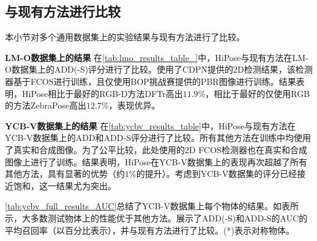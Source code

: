 \subsection{与现有方法进行比较}
本小节对多个通用数据集上的实验结果与现有方法进行了比较。



\textbf{LM-O数据集上的结果 } 在\autoref{tab:lmo_results_table_}中，HiPose与现有方法在LM-O数据集上的ADD(-S)评分进行了比较。使用了CDPN\cite{li2019cdpn}提供的2D检测结果，该检测器基于FCOS\cite{fcos}进行训练，且仅使用BOP挑战赛提供的PBR图像进行训练。结果表明，HiPose相比于最好的RGB-D方法DFTr高出$11.9\%$，相比于最好的仅使用RGB的方法ZebraPose高出$12.7\%$，表现优异。



\textbf{YCB-V数据集上的结果 } 在\autoref{tab:ycbv_results_table}中，HiPose与现有方法在YCB-V数据集上的ADD和ADD-S评分进行了比较。所有其他方法在训练中均使用了真实和合成图像。为了公平比较，此处使用的2D FCOS检测器也在真实和合成图像上进行了训练。结果表明，HiPose在YCB-V数据集上的表现再次超越了所有其他方法，具有显著的优势（约$1\%$的提升）。考虑到YCB-V数据集的评分已经接近饱和，这一结果尤为突出。

\autoref{tab:ycbv_full_results_AUC}总结了YCB-V数据集上每个物体的结果。如表所示，大多数测试物体上的性能优于其他方法。展示了ADD(-S)和ADD-S的AUC的平均召回率（以百分比表示），并与现有方法进行了比较。(*)表示对称物体。



